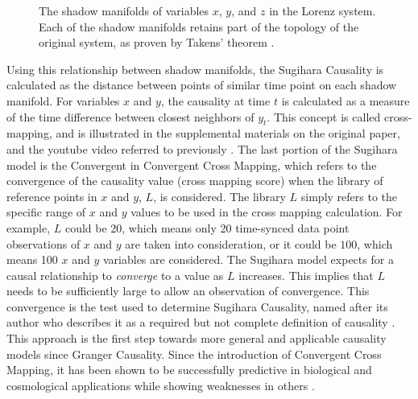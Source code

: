 \begin{figure}
\begin{subfigure}{0.30\textwidth}
	\end{subfigure}
	\caption{The shadow manifolds of variables $x$, $y$, and $z$ in the Lorenz system. Each of the shadow manifolds retains part of the topology of the original system, as proven by Takens' theorem \cite{Takens1981}.}
	\label{fig:lorenz_topology}
\end{figure}

Using this relationship between shadow manifolds, the Sugihara Causality is calculated as the distance between points of similar time point on each shadow manifold. For variables $x$ and $y$, the causality at time $t$ is calculated as a measure of the time difference between closest neighbors of $y_t$. This concept is called cross-mapping, and is illustrated in the supplemental materials on the original paper, and the youtube video referred to previously \cite{Sugihara2012, TakensYoutube2012}. The last portion of the Sugihara model is the Convergent in Convergent Cross Mapping, which refers to the convergence of the causality value (cross mapping score) when the library of reference points in $x$ and $y$, $L$, is considered. The library $L$ simply refers to the specific range of $x$ and $y$ values to be used in the cross mapping calculation. For example, $L$ could be 20, which means only 20 time-synced data point observations of $x$ and $y$ are taken into consideration, or it could be $100$, which means 100 $x$ and $y$ variables are considered. The Sugihara model expects for a causal relationship to \textit{converge} to a value as $L$ increases. This implies that $L$ needs to be sufficiently large to allow an observation of convergence. This convergence is the test used to determine Sugihara Causality, named after its author who describes it as a required but not complete definition of causality \cite{Sugihara2012}. This approach is the first step towards more general and applicable causality models since Granger Causality. Since the introduction of Convergent Cross Mapping, it has been shown to be successfully predictive in biological \cite{Deyle16042013,Wang2014,Sugihara2012,Mcbride2015,Nes2015} and cosmological \cite{Tsonis2015} applications while showing weaknesses in others \cite{Mccracken2014}. 

